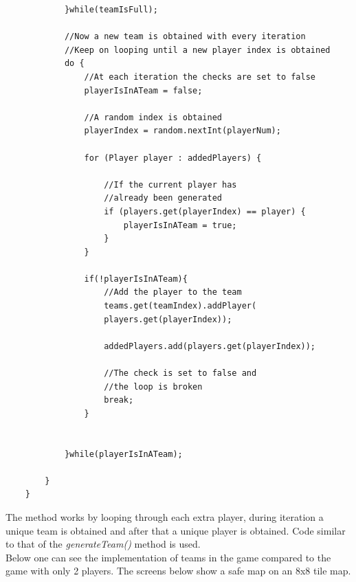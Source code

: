 \documentclass[a4paper,12pt]{extarticle}
\begin{document}
\begin{lstlisting}
            }while(teamIsFull);

            //Now a new team is obtained with every iteration
            //Keep on looping until a new player index is obtained
            do {
                //At each iteration the checks are set to false
                playerIsInATeam = false;

                //A random index is obtained
                playerIndex = random.nextInt(playerNum);

                for (Player player : addedPlayers) {

                    //If the current player has 
                    //already been generated
                    if (players.get(playerIndex) == player) {
                        playerIsInATeam = true;
                    }
                }

                if(!playerIsInATeam){
                    //Add the player to the team
                    teams.get(teamIndex).addPlayer(
                    players.get(playerIndex));

                    addedPlayers.add(players.get(playerIndex));

                    //The check is set to false and 
                    //the loop is broken
                    break;
                }


            }while(playerIsInATeam);

        }
    }
\end{lstlisting}
\vspace{4mm}

\noindent The method works by looping through each extra player, during iteration a unique team is obtained and after that a unique player is obtained. Code similar to that of the \textit{generateTeam()} method is used.\\

\noindent Below one can see the implementation of teams in the game compared to the game with only 2 players. The screens below show a safe map on an 8x8 tile map.
\end{document}
